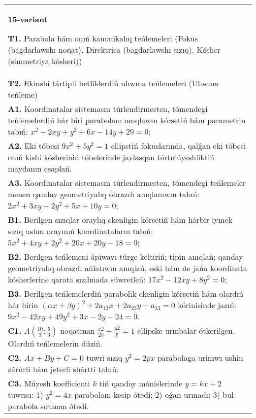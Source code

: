 \documentclass{article}
\begin{document}
\begin{tabular}{m{17cm}}
\textbf{15-variant}
\newline

\textbf{T1.} Parabola hám onıń kanonikalıq teńlemeleri (Fokus (bagdarlawshı noqat), Direktrisa (bagdarlawshı sızıq), Kósher (simmetriya kósheri)) \\
\textbf{T2.} Ekinshi tártipli betliklerdiń ulıwma teńlemeleri (Ulıwma teńleme) \\
\textbf{A1.} Koordinatalar sistemasın túrlendirmesten, tómendegi teńlemelerdiń hár biri parabolanı anıqlawın kórsetiń hám parametrin tabıń: $x^2-2 x y+y^2+6 x-14 y+29=0$; \\
\textbf{A2.} Eki tóbesi $9 x^2+5 y^2=1$ ellipstiń fokuslarında, qalǵan eki tóbesi onıń kishi kósheriniń tóbelerinde jaylasqan tórtmúyeshliktiń maydanın esaplań. \\
\textbf{A3.} Koordinatalar sistemasın túrlendirmesten, tómendegi teńlemeler menen qanday geometriyalıq obrazdı anıqlanıwın tabıń: $2 x^2+3 x y-2 y^2+5 x+10 y=0$; \\
\textbf{B1.} Berilgen sızıqlar oraylıq ekenligin kórsetiń hám hárbir iymek sızıq ushın orayınıń koordinataların tabıń:$5 x^2+4 x y+2 y^2+20 x+20 y-18=0$; \\
\textbf{B2.} Berilgen teńlemeni ápiwayı túrge keltiriń; tipin anıqlań; qanday geometriyalıq obrazdı ańlatıwın anıqlań, eski hám de jańa koordinata kósherlerine qarata sızılmada súwretleń: $17 x^2-12 x y+8 y^2=0$; \\
\textbf{B3.} Berilgen teńlemelerdiń parabolik ekenligin kórsetiń hám olardıń hár birin $(\alpha x+\beta y)^2+2 a_{13} x+2 a_{23} y+a_{33}=0$ kórinisinde jazıń:  $9 x^2-42 x y+49 y^2+3 x-2 y-24=0$. \\
\textbf{C1.} $A\left(\frac{10}{3}; \frac{5}{3}\right)$ noqatınan $\frac{x2}{20}+\frac{y2}{5}=1$ ellipske urınbalar ótkerilgen. Olardıń teńlemelerin dúziń. \\
\textbf{C2.} $A x+B y+C=0$ tuwri sızıq $y^2=2 p x$ parabolaga urinıwı ushin zárúrli hám jeterli shártti tabıń. \\
\textbf{C3.} Múyesh koefficienti $k$ tiń qanday mánislerinde $y=kx+2$ tuwrısı: 1) $y^2=4x$ parabolanı kesip ótedi; 2) oǵan urınadı; 3) bul parabola sırtınan ótedi. \\

\end{tabular}
\vspace{1cm}
\end{document}

